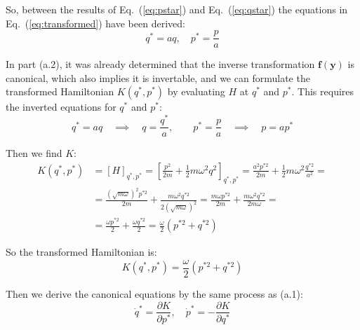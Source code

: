 \documentclass[titlepage]{article}
\begin{document}
\begin{mdframed}[linewidth=1pt, innertopmargin=10pt, innerbottommargin=10pt]
	So, between the results of Eq.~(\ref{eq:pstar}) and Eq.~(\ref{eq:qstar}) the equations in Eq.~(\ref{eq:transformed}) have been derived:
	\begin{equation}
		q^*=aq,\quad p^*=\frac{p}{a}
	\end{equation}
\end{mdframed}

In part (a.2), it was already determined that the inverse transformation $\boldsymbol{f}(\boldsymbol{y})$ is canonical, which also implies it is invertable, and we can formulate the transformed Hamiltonian $K(q^*,p^*)$ by evaluating $H$ at $q^*$ and $p^*$. This requires the inverted equations for $q^*$ and $p^*$:
\begin{equation}
	q^*=aq\quad\implies\quad q=\frac{q^*}{a},\qquad p^*=\frac{p}{a}\quad\implies\quad p=ap^*
\end{equation}

Then we find $K$:
\begin{equation}
	\begin{split}
		K(q^*,p^*)&=[H]_{q^*,p^*}=\left[\frac{p^2}{2m}+\frac{1}{2}m\omega^2q^2\right]_{q^*,p^*}=\frac{a^2p^{*2}}{2m}+\frac{1}{2}m\omega^2\frac{q^{*2}}{a^2}= \\
		&=\frac{(\sqrt{m\omega})^2p^{*2}}{2m}+\frac{m\omega^2q^{*2}}{2(\sqrt{m\omega})^2}=\frac{m\omega p^{*2}}{2m}+\frac{m\omega^2q^{*2}}{2m\omega}= \\
		&=\frac{\omega p^{*2}}{2}+\frac{\omega q^{*2}}{2}=\frac{\omega}{2}\left(p^{*2}+q^{*2}\right)
	\end{split}
\end{equation}

\begin{mdframed}[linewidth=1pt, innertopmargin=10pt, innerbottommargin=10pt]
	So the transformed Hamiltonian is:
	\begin{equation}
		K(q^*,p^*)=\frac{\omega}{2}\left(p^{*2}+q^{*2}\right)
	\end{equation}
\end{mdframed}

Then we derive the canonical equations by the same process as (a.1):
\begin{equation}
	\dot{q}^*=\frac{\partial K}{\partial p^*},\quad \dot{p}^*=-\frac{\partial K}{\partial q^*}
\end{equation}

\newpage
\end{document}

